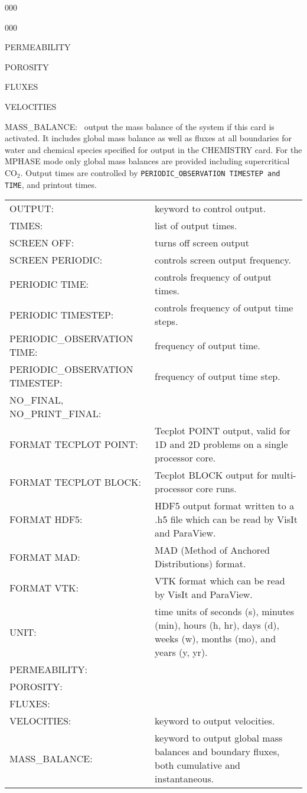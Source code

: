 \begin{deflist}{000}
\begin{deflist}{000}
\item[PERMEABILITY]
\item[POROSITY]
\item[FLUXES]
\item[VELOCITIES]
\item[MASS\_BALANCE:] \ output the mass balance of the system if this card is activated. It includes global mass balance as well as fluxes at all boundaries for water and chemical species specified for output in the CHEMISTRY card. For the MPHASE mode only global mass balances are provided including supercritical CO$_2$. Output times are controlled by {\tt PERIODIC\_OBSERVATION TIMESTEP and TIME}, and printout times.
\end{deflist}
\item[\keyend]
\end{deflist}


\begin{center}
\begin{tabularx}{\linewidth}{lX}
OUTPUT: & keyword to control output.\\
TIMES: & list of output times.\\
SCREEN OFF: & turns off screen output\\
SCREEN PERIODIC: & controls screen output frequency.\\
PERIODIC TIME: & controls frequency of output times.\\
PERIODIC TIMESTEP: & controls frequency of output time steps.\\
PERIODIC\_OBSERVATION TIME: & frequency of output time.\\
PERIODIC\_OBSERVATION TIMESTEP: & frequency of output time step.\\
NO\_FINAL, NO\_PRINT\_FINAL: & \\
FORMAT TECPLOT POINT: & Tecplot POINT output, valid for 1D and 2D problems on a single processor core.\\
FORMAT TECPLOT BLOCK: & Tecplot BLOCK output for multi-processor core runs.\\
FORMAT HDF5: & HDF5 output format written to a .h5 file which can be read by VisIt and ParaView.\\
FORMAT MAD: & MAD (Method of Anchored Distributions) format.\\
FORMAT VTK: & VTK format which can be read by VisIt and ParaView.\\
UNIT: & time units of seconds (s), minutes (min), hours (h, hr), days (d), weeks (w), months (mo), and years (y, yr).\\
PERMEABILITY: & \\
POROSITY: & \\
FLUXES: & \\
VELOCITIES: & keyword to output velocities.\\
MASS\_BALANCE: & keyword to output global mass balances and boundary fluxes, both cumulative and instantaneous.
\end{tabularx}
\end{center}

